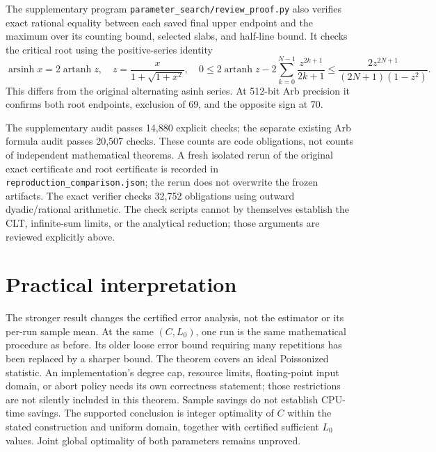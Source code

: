 \documentclass[10pt]{article}
\begin{document}
The supplementary program \texttt{parameter\_search/review\_proof.py}
also verifies exact rational equality between each saved final upper
endpoint and the maximum over its counting bound, selected slabs, and
half-line bound. It checks the critical root using the positive-series
identity
\[
\operatorname{arsinh}x=2\operatorname{artanh}z,
\quad z=\frac{x}{1+\sqrt{1+x^2}},\quad
0\le 2\operatorname{artanh}z-2\sum_{k=0}^{N-1}
 \frac{z^{2k+1}}{2k+1}
\le\frac{2z^{2N+1}}{(2N+1)(1-z^2)}.
\]
This differs from the original alternating asinh series. At 512-bit Arb
precision it confirms both root endpoints, exclusion of 69, and the
opposite sign at 70.

The supplementary audit passes 14,880 explicit checks; the separate
existing Arb formula audit passes 20,507 checks. These counts are code
obligations, not counts of independent mathematical theorems. A fresh
isolated rerun of the original exact certificate and root certificate is
recorded in \texttt{reproduction\_comparison.json}; the rerun does not
overwrite the frozen artifacts. The exact verifier checks 32,752
obligations using outward dyadic/rational arithmetic. The check scripts
cannot by themselves establish the CLT, infinite-sum limits, or the
analytical reduction; those arguments are reviewed explicitly above.

\section{Practical interpretation}
The stronger result changes the certified error analysis, not the estimator
or its per-run sample mean. At the same $(C,L_0)$, one run is the same
mathematical procedure as before. Its older loose error bound requiring
many repetitions has been replaced by a sharper bound.
The theorem covers an ideal Poissonized statistic. An implementation's
degree cap, resource limits, floating-point input domain, or abort policy
needs its own correctness statement; those restrictions are not silently
included in this theorem. Sample savings do not establish CPU-time savings.
The supported conclusion is integer optimality of $C$ within the stated
construction and uniform domain, together with certified sufficient $L_0$
values. Joint global optimality of both parameters remains unproved.
\end{document}

